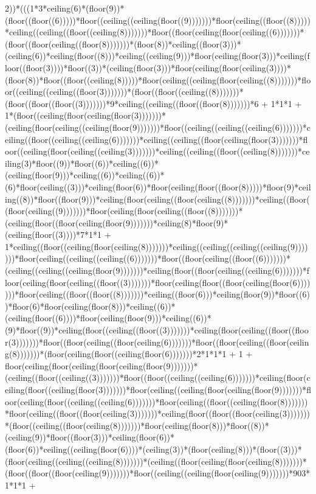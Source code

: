 2))*(((1*3*ceiling(6)*(floor(9))*(floor((floor((6)))))*floor((ceiling((ceiling(floor((9)))))))*floor(ceiling((floor((8)))))*ceiling((ceiling((floor((ceiling(8)))))))*floor((floor(ceiling(floor(ceiling((6)))))))*(floor((floor(ceiling((floor(8)))))))*(floor(8))*ceiling((floor(3)))*(ceiling(6))*ceiling(floor((8)))*ceiling((ceiling(9)))*floor(ceiling(floor(3)))*ceiling(floor((floor(3))))*floor((3))*(ceiling(floor(3)))*floor(ceiling(floor(ceiling(3))))*(floor(8))*floor((floor((ceiling(8)))))*floor(ceiling((ceiling(floor(ceiling((8)))))))*floor((ceiling((ceiling((floor(3)))))))*(floor((floor((ceiling((8)))))))*(floor((floor((floor((3)))))))*9*ceiling((ceiling((floor((floor(8)))))))*6 + 1*1*1 + 1*(floor((ceiling(floor(ceiling(floor(3)))))))*(ceiling(floor(ceiling((ceiling(floor(9)))))))*floor((ceiling((ceiling((ceiling(6)))))))*ceiling((floor((ceiling((ceiling(6)))))))*ceiling((ceiling((floor(ceiling(floor(3)))))))*floor((ceiling(floor(ceiling((ceiling(3)))))))*ceiling((ceiling((floor((ceiling(8)))))))*ceiling(3)*floor((9))*floor((6))*ceiling((6))*(ceiling(floor(9)))*ceiling((6))*ceiling((6))*(6)*floor(ceiling((3)))*ceiling(floor(6))*floor(ceiling(floor((floor(8)))))*floor(9)*ceiling((8))*floor((floor(9)))*ceiling(floor(ceiling((floor(ceiling((8)))))))*ceiling((floor((floor(ceiling((9)))))))*floor(ceiling(floor(ceiling((floor((8)))))))*(ceiling(floor((floor(ceiling(floor(9)))))))*ceiling(8)*floor(9)*(ceiling(floor((3))))*7*1*1 + 1*ceiling((floor((ceiling(floor(ceiling(8)))))))*ceiling((ceiling((ceiling((ceiling(9)))))))*floor(ceiling((ceiling((ceiling((6)))))))*floor((floor(ceiling((floor((6)))))))*(ceiling((ceiling((ceiling(floor(9)))))))*ceiling(floor((floor(ceiling((ceiling(6)))))))*floor(ceiling(floor(ceiling((floor((3)))))))*floor(ceiling(floor((floor(ceiling(floor(6)))))))*floor(ceiling((floor((floor((8)))))))*ceiling((floor(6)))*ceiling(floor(9))*floor((6))*floor(6)*floor(ceiling(floor(8)))*ceiling((6))*(ceiling(floor((6))))*floor(ceiling(floor(9)))*ceiling((6))*(9)*floor((9))*ceiling(floor((ceiling((floor((3)))))))*ceiling(floor(ceiling((floor((floor(3)))))))*floor((floor(ceiling((floor(ceiling(6)))))))*floor((floor(ceiling((floor(ceiling(8)))))))*(floor(ceiling(floor((ceiling(floor(6)))))))*2*1*1*1 + 1 + floor(ceiling(floor(ceiling(floor(ceiling(floor(9)))))))*(ceiling((floor((ceiling((3)))))))*floor((floor((ceiling((ceiling(6)))))))*ceiling(floor(ceiling(floor((ceiling(floor(3)))))))*floor(ceiling((ceiling(floor(ceiling(floor(9)))))))*floor(ceiling(floor((ceiling((ceiling(6)))))))*floor(ceiling((floor((ceiling(floor(8)))))))*floor(ceiling((floor((floor(ceiling(3)))))))*ceiling(floor((floor((floor(ceiling(3)))))))*(floor((ceiling((floor(ceiling(8)))))))*floor(ceiling(floor(8)))*floor((8))*(ceiling(9))*floor((floor(3)))*ceiling(floor(6))*(floor(6))*ceiling((ceiling(floor(6))))*(ceiling(3))*(floor(ceiling(8)))*(floor((3)))*(floor(ceiling((ceiling((ceiling(8)))))))*(ceiling((floor(ceiling(floor(ceiling(8)))))))*(floor((floor((floor(ceiling(9)))))))*floor((ceiling((ceiling(floor(ceiling(9)))))))*903*1*1*1 + 